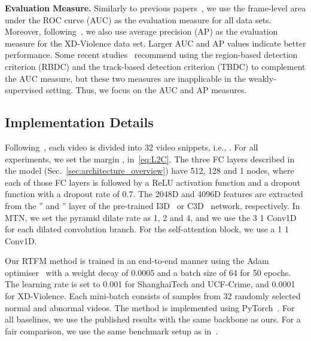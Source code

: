 \documentclass[final]{cvpr}
\begin{document}
\textbf{Evaluation Measure.} Similarly  to previous papers~\cite{sultani2018real,liu2018future,8803657,9102722,gong2019memorizing}, we use the frame-level area under the ROC curve (AUC) as the evaluation measure for all data sets. 
Moreover, following~\cite{Wu2020not}, we also use average precision (AP) as the evaluation measure for the XD-Violence data set. Larger AUC and AP values indicate better performance. Some recent studies~\cite{georgescu2020anomaly,ramachandra2020survey} recommend using the region-based detection criterion (RBDC) and the track-based detection criterion (TBDC) to complement the AUC measure, but these two measures are inapplicable in the weakly-supervised setting. Thus, we focus on the AUC and AP measures.




\subsection{Implementation Details} \label{subsec:imp}
Following~\cite{sultani2018real}, each video is divided into 32 video snippets, i.e., .
For all experiments, we set the margin ,  in~\eqref{eq:L2C}.
The three FC layers described in the model (Sec.~\ref{sec:architecture_overview}) have 512, 128 and 1 nodes, where each of those FC layers is followed by a ReLU activation function and a dropout function with a dropout rate of 0.7. The 2048D and 4096D features are extracted from the '' and '' layer of the pre-trained I3D~\cite{kay2017kinetics} or C3D~\cite{KarpathyCVPR14} network, respectively. In MTN, we set the pyramid dilate rate as 1, 2 and 4, and we use the 3  1 Conv1D for each dilated convolution branch. For the self-attention block, we use a 1  1 Conv1D. 



Our RTFM method is trained in an end-to-end manner using the Adam optimiser~\cite{kingma2014adam} with a weight decay of 0.0005 and a batch size of 64 for 50 epochs. 
The learning rate is set to 0.001 for ShanghaiTech and UCF-Crime, and 0.0001 for XD-Violence. Each mini-batch consists of samples from 32 randomly selected normal and abnormal videos. The method is implemented using PyTorch~\cite{NEURIPS2019_9015}. 
For all baselines, we use the published results with the same backbone as ours. For a fair comparison, we use the same benchmark setup as in~\cite{sultani2018real,Wu2020not,zhong2019graph}.
\end{document}
